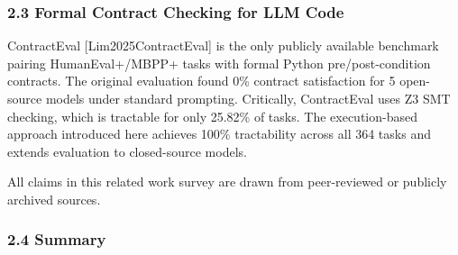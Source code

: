 \subsubsection{2.3 Formal Contract Checking for LLM Code}

ContractEval [Lim2025ContractEval] is the only publicly available benchmark pairing HumanEval+/MBPP+ tasks with formal Python pre/post-condition contracts. The original evaluation found 0\% contract satisfaction for 5 open-source models under standard prompting. Critically, ContractEval uses Z3 SMT checking, which is tractable for only 25.82\% of tasks. The execution-based approach introduced here achieves 100\% tractability across all 364 tasks and extends evaluation to closed-source models.

All claims in this related work survey are drawn from peer-reviewed or publicly archived sources.

\subsubsection{2.4 Summary}

\begin{table}[htbp]
\centering
{}
\end{table}

